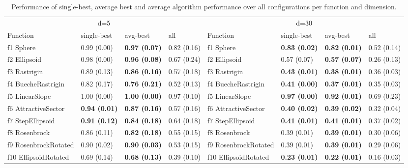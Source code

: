 \begin{table}
\caption{Performance of single-best, average best and average algorithm performance over all configurations per function and dimension.}
\begin{tabular}{llllllll}
\toprule
\multicolumn{4}{c}{d=5} & \multicolumn{4}{c}{d=30} \\
Function & single-best & avg-best & all & Function & single-best & avg-best & all \\
\midrule
f1 Sphere & 0.99 (0.00) & \textbf{0.97 (0.07)} & 0.82 (0.16) & f1 Sphere & \textbf{0.83 (0.02)} & \textbf{0.82 (0.01)} & 0.52 (0.14) \\
f2 Ellipsoid & 0.98 (0.00) & \textbf{0.96 (0.08)} & 0.67 (0.24) & f2 Ellipsoid & 0.57 (0.07) & \textbf{0.57 (0.07)} & 0.26 (0.13) \\
f3 Rastrigin & 0.89 (0.13) & \textbf{0.86 (0.16)} & 0.57 (0.18) & f3 Rastrigin & \textbf{0.43 (0.01)} & \textbf{0.38 (0.01)} & 0.36 (0.03) \\
f4 BuecheRastrigin & 0.82 (0.17) & \textbf{0.76 (0.21)} & 0.52 (0.13) & f4 BuecheRastrigin & \textbf{0.41 (0.00)} & \textbf{0.37 (0.01)} & 0.35 (0.03) \\
f5 LinearSlope & 1.00 (0.00) & \textbf{1.00 (0.00)} & 0.97 (0.10) & f5 LinearSlope & \textbf{0.97 (0.00)} & \textbf{0.92 (0.01)} & 0.69 (0.23) \\
f6 AttractiveSector & \textbf{0.94 (0.01)} & \textbf{0.87 (0.16)} & 0.57 (0.16) & f6 AttractiveSector & \textbf{0.40 (0.02)} & \textbf{0.39 (0.02)} & 0.32 (0.04) \\
f7 StepEllipsoid & \textbf{0.91 (0.12)} & \textbf{0.84 (0.18)} & 0.64 (0.18) & f7 StepEllipsoid & \textbf{0.41 (0.01)} & \textbf{0.41 (0.01)} & 0.37 (0.02) \\
f8 Rosenbrock & 0.86 (0.11) & \textbf{0.82 (0.18)} & 0.55 (0.15) & f8 Rosenbrock & 0.39 (0.01) & \textbf{0.39 (0.01)} & 0.30 (0.06) \\
f9 RosenbrockRotated & 0.90 (0.02) & \textbf{0.90 (0.03)} & 0.53 (0.15) & f9 RosenbrockRotated & 0.39 (0.01) & \textbf{0.39 (0.01)} & 0.29 (0.06) \\
f10 EllipsoidRotated & 0.69 (0.14) & \textbf{0.68 (0.13)} & 0.39 (0.10) & f10 EllipsoidRotated & \textbf{0.23 (0.01)} & \textbf{0.22 (0.01)} & 0.16 (0.03) \\

\end{tabular}
\end{table}
